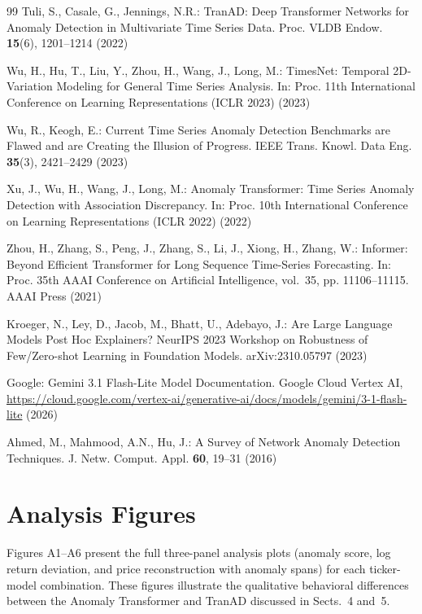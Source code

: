 \documentclass{llncs}
\begin{document}
\begin{thebibliography}{99}
Tuli, S., Casale, G., Jennings, N.R.:
TranAD: Deep Transformer Networks for Anomaly Detection in Multivariate Time Series Data.
Proc. VLDB Endow. \textbf{15}(6), 1201--1214 (2022)

Wu, H., Hu, T., Liu, Y., Zhou, H., Wang, J., Long, M.:
TimesNet: Temporal 2D-Variation Modeling for General Time Series Analysis.
In: Proc. 11th International Conference on Learning Representations (ICLR 2023) (2023)

Wu, R., Keogh, E.:
Current Time Series Anomaly Detection Benchmarks are Flawed and are Creating the Illusion of Progress.
IEEE Trans. Knowl. Data Eng. \textbf{35}(3), 2421--2429 (2023)

Xu, J., Wu, H., Wang, J., Long, M.:
Anomaly Transformer: Time Series Anomaly Detection with Association Discrepancy.
In: Proc. 10th International Conference on Learning Representations (ICLR 2022) (2022)

Zhou, H., Zhang, S., Peng, J., Zhang, S., Li, J., Xiong, H., Zhang, W.:
Informer: Beyond Efficient Transformer for Long Sequence Time-Series Forecasting.
In: Proc. 35th AAAI Conference on Artificial Intelligence, vol.~35, pp. 11106--11115.
AAAI Press (2021)

Kroeger, N., Ley, D., Jacob, M., Bhatt, U., Adebayo, J.:
Are Large Language Models Post Hoc Explainers?
NeurIPS 2023 Workshop on Robustness of Few/Zero-shot Learning in Foundation Models.
arXiv:2310.05797 (2023)

Google:
Gemini 3.1 Flash-Lite Model Documentation.
Google Cloud Vertex AI, \url{https://cloud.google.com/vertex-ai/generative-ai/docs/models/gemini/3-1-flash-lite} (2026)

Ahmed, M., Mahmood, A.N., Hu, J.:
A Survey of Network Anomaly Detection Techniques.
J. Netw. Comput. Appl. \textbf{60}, 19--31 (2016)

\end{thebibliography}

\clearpage
\appendix
\renewcommand{\thefigure}{A\arabic{figure}}
\setcounter{figure}{0}
\section{Analysis Figures}

Figures A1--A6 present the full three-panel analysis plots (anomaly score, log return deviation, and price reconstruction with anomaly spans) for each ticker-model combination. These figures illustrate the qualitative behavioral differences between the Anomaly Transformer and TranAD discussed in Sects.~4 and~5.
\end{document}
